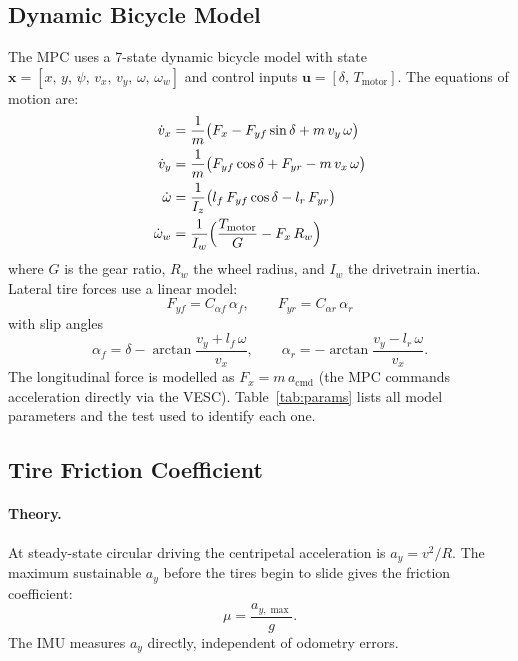 \documentclass[11pt,a4paper]{article}
\begin{document}
\subsection{Dynamic Bicycle Model}\label{sec:bicycle-model}

The MPC uses a 7-state dynamic bicycle model with state
$\mathbf{x} = [x,\, y,\, \psi,\, v_x,\, v_y,\, \omega,\, \omega_w]$
and control inputs $\mathbf{u} = [\delta,\, T_\text{motor}]$.
The equations of motion are:
\begin{align}
  \dot{v}_x &= \frac{1}{m}\bigl(F_x - F_{yf}\sin\delta + m\,v_y\,\omega\bigr)
  \label{eq:dvx}\\
  \dot{v}_y &= \frac{1}{m}\bigl(F_{yf}\cos\delta + F_{yr} - m\,v_x\,\omega\bigr)
  \label{eq:dvy}\\
  \dot{\omega} &= \frac{1}{I_z}\bigl(l_f\,F_{yf}\cos\delta - l_r\,F_{yr}\bigr)
  \label{eq:domega}\\
  \dot{\omega}_w &= \frac{1}{I_w}\Bigl(\frac{T_\text{motor}}{G} - F_x\,R_w\Bigr)
  \label{eq:domegaw}
\end{align}
where $G$ is the gear ratio, $R_w$ the wheel radius, and $I_w$ the
drivetrain inertia. Lateral tire forces use a linear model:
\begin{equation}\label{eq:tire-lat}
  F_{yf} = C_{\alpha f}\,\alpha_f, \qquad
  F_{yr} = C_{\alpha r}\,\alpha_r
\end{equation}
with slip angles
\begin{equation}\label{eq:slip-angles}
  \alpha_f = \delta - \arctan\!\frac{v_y + l_f\,\omega}{v_x}, \qquad
  \alpha_r = -\arctan\!\frac{v_y - l_r\,\omega}{v_x}.
\end{equation}
The longitudinal force is modelled as $F_x = m\,a_\text{cmd}$ (the MPC
commands acceleration directly via the VESC). Table~\ref{tab:params} lists
all model parameters and the test used to identify each one.

\subsection{Tire Friction Coefficient}\label{sec:friction}

\paragraph{Theory.}
At steady-state circular driving the centripetal acceleration is
$a_y = v^2/R$. The maximum sustainable $a_y$ before the tires begin to
slide gives the friction coefficient:
\begin{equation}\label{eq:mu}
  \mu = \frac{a_{y,\max}}{g}.
\end{equation}
The IMU measures $a_y$ directly, independent of odometry errors.
\end{document}
